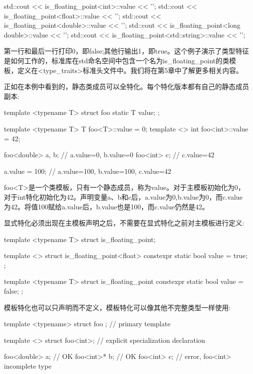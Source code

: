 \begin{cpp}
std::cout << is_floating_point<int>::value << '\n';
std::cout << is_floating_point<float>::value << '\n';
std::cout << is_floating_point<double>::value << '\n';
std::cout << is_floating_point<long double>::value << '\n';
std::cout << is_floating_point<std::string>::value << '\n';
\end{cpp}

第一行和最后一行打印0，即false;其他行输出1，即true。这个例子演示了类型特征是如何工作的，标准库在std命名空间中包含一个名为is\_floating\_point的类模板，定义在<type\_traits>标准头文件中。我们将在第5章中了解更多相关内容。

正如在本例中看到的，静态类成员可以全特化。每个特化版本都有自己的静态成员副本:

\begin{cpp}
template <typename T>
struct foo
{
	static T value;
};

template <typename T> T foo<T>::value = 0;
template <> int foo<int>::value = 42;

foo<double> a, b; // a.value=0, b.value=0
foo<int> c; // c.value=42

a.value = 100; // a.value=100, b.value=100, c.value=42
\end{cpp}

foo<T>是一个类模板，只有一个静态成员，称为value。对于主模板初始化为0，对于int特化初始化为42。声明变量a、b和c后，a.value为0,b.value为0，而c.value为42。将值100赋给a.value后，b.value也是100，而c.value仍然是42。

显式特化必须出现在主模板声明之后，不需要在显式特化之前对主模板进行定义:

\begin{cpp}
template <typename T>
struct is_floating_point;

template <>
struct is_floating_point<float>
{
	constexpr static bool value = true;
};

template <typename T>
struct is_floating_point
{
	constexpr static bool value = false;
};
\end{cpp}

模板特化也可以只声明而不定义，模板特化可以像其他不完整类型一样使用:

\begin{cpp}
template <typename>
struct foo {}; // primary template

template <>
struct foo<int>; // explicit specialization declaration

foo<double> a; // OK
foo<int>* b; // OK
foo<int> c; // error, foo<int> incomplete type
\end{cpp}

